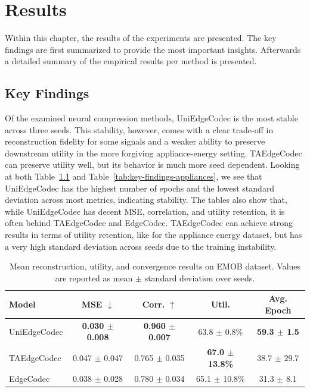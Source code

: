 \chapter{Results}

Within this chapter, the results of the experiments are presented. The key findings are first summarized to provide the most important insights. Afterwards a detailed summary of the empirical results per method is presented.

\section{Key Findings}

Of the examined neural compression methods, UniEdgeCodec is the most stable across three seeds. This stability, however, comes with a clear trade-off in reconstruction fidelity for some signals and a weaker ability to preserve downstream utility in the more forgiving appliance-energy setting. TAEdgeCodec can preserve utility well, but its behavior is much more seed dependent. Looking at both Table~\ref{tab:key-findings-emob} and Table~\ref{tab:key-findings-appliances}, we see that UniEdgeCodec has the highest number of epochs and the lowest standard deviation across most metrics, indicating stability. The tables also show that, while UniEdgeCodec has decent MSE, correlation, and utility retention, it is often behind TAEdgeCodec and EdgeCodec. TAEdgeCodec can achieve strong results in terms of utility retention, like for the appliance energy dataset, but has a very high standard deviation across seeds due to the training instability. 

\begin{table}[htbp]
\centering
\small
\caption{Mean reconstruction, utility, and convergence results on EMOB dataset. Values are reported as mean $\pm$ standard deviation over seeds.}
\label{tab:key-findings-emob}
\begin{tabular}{lcccc}
\toprule
\textbf{Model} & \textbf{MSE} $\downarrow$ & \textbf{Corr.} $\uparrow$ & \textbf{Util.} & \textbf{Avg. Epoch} \\
\midrule
UniEdgeCodec & \textbf{0.030 $\pm$ 0.008} & \textbf{0.960 $\pm$ 0.007} & 63.8 $\pm$ 0.8\% & \textbf{59.3 $\pm$ 1.5} \\
TAEdgeCodec  & 0.047 $\pm$ 0.047 & 0.765 $\pm$ 0.035 & \textbf{67.0 $\pm$ 13.8\%} & 38.7 $\pm$ 29.7 \\
EdgeCodec    & 0.038 $\pm$ 0.028 & 0.780 $\pm$ 0.034 & 65.1 $\pm$ 10.8\% & 31.3 $\pm$ 8.1 \\
\bottomrule
\end{tabular}
\end{table}

